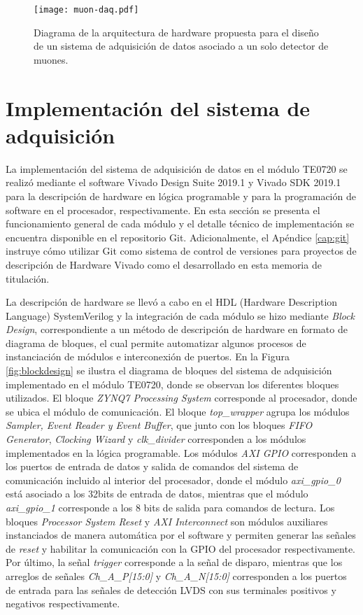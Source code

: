 		
		\begin{figure}[H]
			\centering
			\texttt{[image: muon-daq.pdf]}
			\caption{Diagrama de la arquitectura de hardware propuesta para el diseño de un sistema de adquisición de datos asociado a un solo detector de muones.}
			\label{fig:muon-daq}
		\end{figure}
		
\section{Implementación del sistema de adquisición}
\label{sec:impl}
	La implementación del sistema de adquisición de datos en el módulo TE0720 se realizó mediante el software Vivado Design Suite 2019.1 y Vivado SDK 2019.1 para la descripción de hardware en lógica programable y  para la programación de software en el procesador, respectivamente. En esta sección se presenta el funcionamiento general de cada módulo y el detalle técnico de implementación se encuentra disponible en el repositorio Git\cite{GonzalezMuonRepository}. Adicionalmente, el Apéndice \ref{cap:git} instruye cómo utilizar Git como sistema de control de versiones para proyectos de descripción de Hardware Vivado como el desarrollado en esta memoria de titulación.
	
	La descripción de hardware se llevó a cabo en el HDL (Hardware Description Language) SystemVerilog y la integración de cada módulo se hizo mediante \textit{Block Design}, correspondiente a un método de descripción de hardware en formato de diagrama de bloques, el cual permite automatizar algunos procesos de instanciación de módulos e interconexión de puertos. En la Figura \ref{fig:blockdesign} se ilustra el diagrama de bloques del sistema de adquisición implementado en el módulo TE0720, donde se observan los diferentes bloques utilizados. El bloque \textit{ZYNQ7 Processing System} corresponde al procesador, donde se ubica el módulo de comunicación. El bloque \textit{top\_wrapper} agrupa los módulos \textit{Sampler, Event Reader y Event Buffer}, que junto con los bloques \textit{FIFO Generator}, \textit{Clocking Wizard} y \textit{clk\_divider} corresponden a los módulos implementados en la lógica programable. Los módulos \textit{AXI GPIO} corresponden a los puertos de entrada de datos y salida de comandos del sistema de comunicación incluido al interior del procesador, donde el módulo \textit{axi\_gpio\_0} está asociado a los 32bits de entrada de datos, mientras que el módulo \textit{axi\_gpio\_1} corresponde a los 8 bits de salida para comandos de lectura. Los bloques \textit{Processor System Reset} y \textit{AXI Interconnect} son módulos auxiliares instanciados de manera automática por el software y permiten generar las señales de \textit{reset} y habilitar la comunicación con la GPIO del procesador respectivamente. Por último, la señal \textit{trigger} corresponde a la señal de disparo, mientras que los arreglos de señales \textit{Ch\_A\_P[15:0]} y \textit{Ch\_A\_N[15:0]} corresponden a los puertos de entrada para las señales de detección LVDS con sus terminales positivos y negativos respectivamente.

